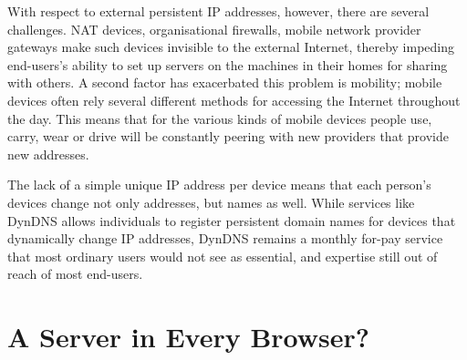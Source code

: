 \documentclass{amsart}
\begin{document}
With respect to external persistent IP addresses, however, there are several challenges.  NAT devices, organisational firewalls, mobile network provider gateways make such devices invisible to the external Internet, thereby impeding end-users's ability to set up servers on the machines in their homes for sharing with others.  A second factor has exacerbated this problem is mobility; mobile devices often rely several different methods for accessing the Internet throughout the day.  This means that for the various kinds of mobile devices people use, carry, wear or drive will be constantly peering with new providers that provide new addresses.  

The lack of a simple unique IP address per device means that each person's devices change not only addresses, but names as well.  While services like DynDNS allows individuals to register persistent domain names for devices that dynamically change IP addresses, DynDNS remains a monthly for-pay service that most ordinary users would not see as essential, and expertise still out of reach of most end-users.

\section{A Server in Every Browser?}



\end{document}
